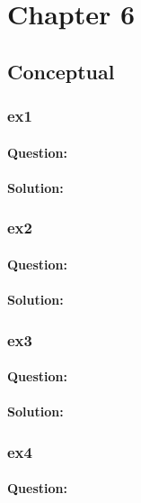 \documentclass[a4paper,12pt,titlepage]{article} %
\begin{document}
\newpage
\section{Chapter 6}
\subsection{Conceptual}
\subsubsection{ex1}
\paragraph{Question:}

\paragraph{Solution:}

\subsubsection{ex2}
\paragraph{Question:}

\paragraph{Solution:}

\subsubsection{ex3}
\paragraph{Question:}

\paragraph{Solution:}

\subsubsection{ex4}
\paragraph{Question:}
\end{document}
